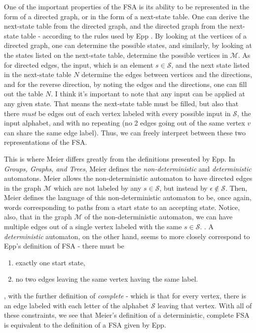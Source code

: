 \documentclass[12pt]{amsart}
\begin{document}
One of the important properties of the FSA is its ability to be represented in the form of a directed graph, or in the form of a next-state table. One can derive the next-state table from the directed graph, and the directed graph from the next-state table - according to the rules used by Epp \cite{epp}. By looking at the vertices of a directed graph, one can determine the possible states, and similarly, by looking at the states listed on the next-state table, determine the possible vertices in $\mathcal{M}$. As for directed edges, the input, which is an element $s\in \mathcal{S}$, and the next state listed in the next-state table $N$ determine the edges between vertices and the directions, and for the reverse direction, by noting the edges and the directions, one can fill out the table $N$. I think it's important to note that any input can be applied at any given state. That means the next-state table must be filled, but also that there \emph{must} be edges out of each vertex labeled with every possible input in $\mathcal{S}$, the input alphabet, and with no repeating (no 2 edges going out of the same vertex $v$ can share the same edge label). Thus, we can freely interpret between these two representations of the FSA.

This is where Meier differs greatly from the definitions presented by Epp. In \emph{Groups, Graphs, and Trees}, Meier defines the \emph{non-deterministic} and \emph{deterministic} automatons. Meier allows the non-deterministic automaton to have directed edges in the graph $\mathcal{M}$ which are not labeled by any $s\in \mathcal{S}$, but instead by $\epsilon\not \in \mathcal{S}$. Then, Meier defines the language of this non-deterministic automaton to be, once again, words corresponding to paths from a start state to an accepting state. Notice, also, that in the graph $\mathcal{M}$ of the non-deterministic automaton, we can have multiple edges out of a single vertex labeled with the same $s\in \mathcal{S}$. \cite{ggt}. A \emph{deterministic} automaton, on the other hand, seems to more closely correspond to Epp's definition of FSA - there must be
\begin{enumerate}
\item exactly one start state,
\item no two edges leaving the same vertex having the same label.
\end{enumerate}, with the further definition of \emph{complete} - which is that for every vertex, there is an edge labeled with each letter of the alphabet $\mathcal{S}$ leaving that vertex\cite{ggt}. With all of these constraints, we see that Meier's definition of a deterministic, complete FSA is equivalent to the definition of a FSA given by Epp.
\end{document}
